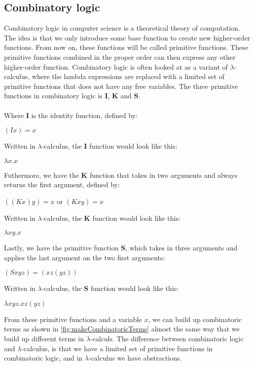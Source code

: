 \subsection{Combinatory logic}
\label{combinatory logic}
Combinatory logic in computer science is a theoretical theory of computation. The idea is that we only introduce some base function to create new higher-order functions. From now on, these functions will be called primitive functions. These primitive functions combined in the proper order can then express any other higher-order function. Combinatory logic is often looked at as a variant of $\lambda$-calculus, where the lambda expressions are replaced with a limited set of primitive functions that does not have any free variables. The three primitive functions in combinatory logic is \textbf{I}, \textbf{K} and \textbf{S}.
\\ \\
Where \textbf{I} is the identity function, defined by: \\ 
\begin{center}
    $(I x) = x$\\    
\end{center}
Written in $\lambda$-calculus, the \textbf{I} function would look like this:\\
\begin{center}
    $\lambda x.x$\\    
\end{center}
Futhermore, we have the \textbf{K} function that takes in two arguments and always returns the first argument, defined by:
\begin{center}
    $ ((K x) y) = x$ or $(K x y) = x$\\    
\end{center}
Written in $\lambda$-calculus, the \textbf{K} function would look like this:\\
\begin{center}
    $\lambda xy.x$\\    
\end{center}
Lastly, we have the primitive function \textbf{S}, which takes in three arguments and applies the last argument on the two first arguments:
\begin{center}
    $ (S x y z) = (x z (y z))$\\    
\end{center}
Written in $\lambda$-calculus, the \textbf{S} function would look like this:\\
\begin{center}
    $\lambda xyz.xz(yz)$\\    
\end{center}
From these primitive functions and a variable $x$, we can build up combinatoric terms as shown in \autoref{fig:makeCombinatoricTerms} almost the same way that we build up different terms in $\lambda$-calculs. The difference between combinatoric logic and $\lambda$-calculus, is that we have a limited set of primitive functions in combinatoric logic, and in $\lambda$-calculus we have abstractions.

